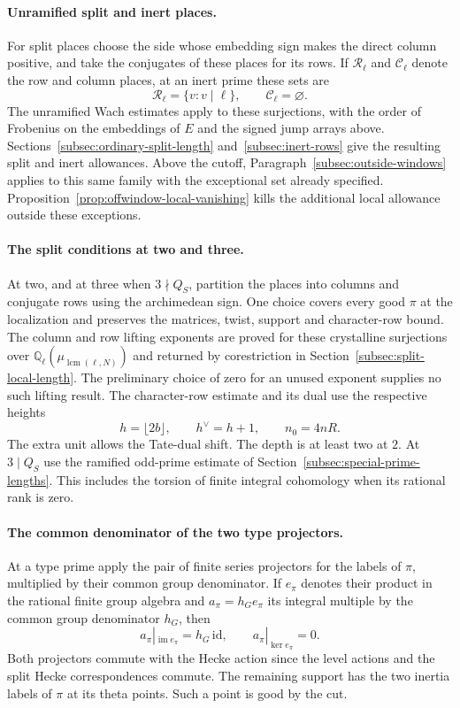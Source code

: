 \paragraph{Unramified split and inert places.}
For split places choose the side whose embedding sign makes
the direct column positive, and take the conjugates of these
places for its rows. If \(\mathcal R_\ell\) and \(\mathcal C_\ell\) denote the row and column places, at an inert prime these sets are
\[
 \mathcal R_\ell=\{v:v\mid\ell\},\qquad \mathcal C_\ell=\varnothing.
\]
The unramified Wach estimates apply to these surjections, with the order of Frobenius on the embeddings of \(E\) and the signed jump arrays above.
Sections~\ref{subsec:ordinary-split-length} and~\ref{subsec:inert-rows}
give the resulting split and inert allowances. Above the
cutoff, Paragraph~\ref{subsec:outside-windows} applies to
this same family with the exceptional set already specified.
Proposition~\ref{prop:offwindow-local-vanishing} kills the additional
local allowance outside these exceptions.

\paragraph{The split conditions at two and three.}
At two, and at three when \(3\nmid Q_S\), partition the places into columns and conjugate rows using the archimedean sign. One choice covers every good \(\pi\) at the localization and preserves the matrices, twist, support and character-row bound.
The column and row lifting exponents are proved for these crystalline surjections over
\(\mathbb Q_\ell(\mu_{\operatorname{lcm}(\ell,N)})\) and
returned by corestriction in Section~\ref{subsec:split-local-length}.
The preliminary choice of zero for an unused exponent supplies
no such lifting result. The character-row estimate and its dual use the respective heights
\[
 h=\lfloor2b\rfloor,\qquad h^\vee=h+1,\qquad n_0=4nR.
\]
The extra unit allows the Tate-dual shift.
The depth is at least two at \(2\). At \(3\mid Q_S\) use the
ramified odd-prime estimate of
Section~\ref{subsec:special-prime-lengths}.
This includes the torsion of finite integral cohomology when
its rational rank is zero. \label{cor:marked-localization-8}

\paragraph{The common denominator of the two type projectors.}
At a type prime apply the pair of finite series projectors
for the labels of \(\pi\), multiplied by their common group
denominator. If \(e_\pi\) denotes their product in the rational
finite group algebra and \(a_\pi=h_Ge_\pi\) its integral
multiple by the common group denominator \(h_G\), then
\[
       a_\pi|_{\operatorname{im} e_\pi}=h_G\,\mathrm{id},
        \qquad a_\pi|_{\ker e_\pi}=0 .
\]
Both projectors commute with the Hecke action since the
level actions and the split Hecke correspondences commute.
The remaining support has the two inertia labels of \(\pi\)
at its theta points. Such a point is good by the cut.

